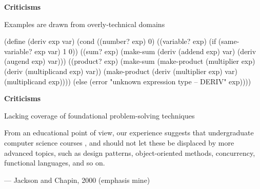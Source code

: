 



\begin{frame}[fragile]

\begin{center}
{\bf Criticisms}
\end{center}
\begin{center}
Examples are drawn from overly-technical domains

\nl

{\scriptsize
\begin{schemecode}
(define (deriv exp var)
  (cond ((number? exp) 0)
        ((variable? exp)
         (if (same-variable? exp var) 1 0))
        ((sum? exp)
         (make-sum (deriv (addend exp) var)
                   (deriv (augend exp) var)))
        ((product? exp)
         (make-sum
           (make-product (multiplier exp)
                         (deriv (multiplicand exp) var))
           (make-product (deriv (multiplier exp) var)
                         (multiplicand exp))))
        (else
         (error "unknown expression type -- DERIV" exp))))
\end{schemecode}
}
\end{center}
\end{frame}


\begin{frame}

\begin{center}
{\bf Criticisms}
\end{center}
\begin{center}
Lacking coverage of foundational problem-solving techniques
\end{center}

\begin{block}{}
From an educational point of view, our experience suggests that undergraduate \\
computer science courses 
, and should not let these be displaced by more advanced topics,
such as design patterns, object-oriented methods, concurrency, functional languages,
and so on.

\nl

--- Jackson and Chapin, 2000
(emphasis mine)
\end{block}
\end{frame}









